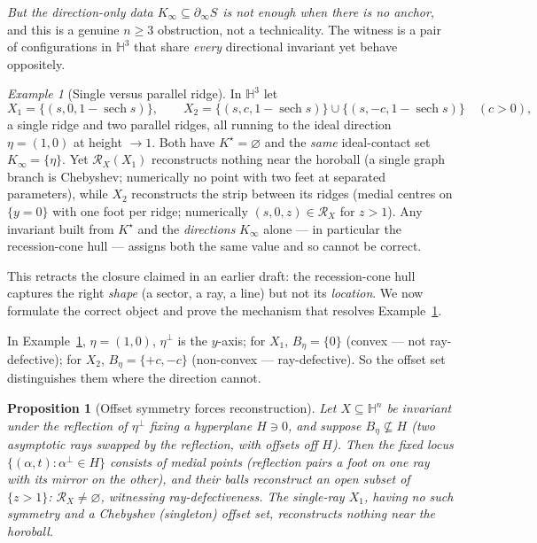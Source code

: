 \documentclass[11pt]{article}
\newtheorem{proposition}[theorem]{Proposition}
\theoremstyle{remark}
\newtheorem{example}[theorem]{Example}
\newcommand{\X}{X}
\newcommand{\Rx}{\mathcal{R}_{\X}}
\newcommand{\Sb}[1]{S_{#1}}
\begin{document}
\emph{But the direction-only data $K_{\infty}\subseteq\partial_{\infty}
\Sb{}$ is not enough when there is no anchor}, and this is a genuine
$n\ge3$ obstruction, not a technicality. The witness is a pair of
configurations in $\mathbb{H}^{3}$ that share \emph{every} directional
invariant yet behave oppositely.

\begin{example}[Single versus parallel ridge]\label{ex:parallel}
In $\mathbb{H}^{3}$ let
\[
\X_{1}=\{(s,0,1-\operatorname{sech}s)\},\qquad
\X_{2}=\{(s,c,1-\operatorname{sech}s)\}\cup\{(s,-c,1-\operatorname{sech}
s)\}\quad(c>0),
\]
a single ridge and two parallel ridges, all running to the ideal
direction $\eta=(1,0)$ at height $\to1$. Both have $K^{\star}=
\varnothing$ and the \emph{same} ideal-contact set $K_{\infty}=
\{\eta\}$. Yet $\Rx(\X_{1})$ reconstructs nothing near the horoball
(a single graph branch is Chebyshev; numerically no point with two feet
at separated parameters), while $\X_{2}$ reconstructs the strip between
its ridges (medial centres on $\{y=0\}$ with one foot per ridge;
numerically $(s,0,z)\in\Rx$ for $z>1$). Any invariant built from
$K^{\star}$ and the \emph{directions} $K_{\infty}$ alone --- in
particular the recession-cone hull --- assigns both the same value and
so cannot be correct.
\end{example}

This retracts the closure claimed in an earlier draft: the
recession-cone hull captures the right \emph{shape} (a sector, a ray, a
line) but not its \emph{location}. We now formulate the correct object
and prove the mechanism that resolves Example~\ref{ex:parallel}.

In Example~\ref{ex:parallel}, $\eta=(1,0)$, $\eta^{\perp}$ is the
$y$-axis; for $\X_{1}$, $B_{\eta}=\{0\}$ (convex --- not ray-defective);
for $\X_{2}$, $B_{\eta}=\{+c,-c\}$ (non-convex --- ray-defective). So
the offset set distinguishes them where the direction cannot.

\begin{proposition}[Offset symmetry forces reconstruction]
\label{prop:offsetsym}
Let $\X\subseteq\mathbb{H}^{n}$ be invariant under the reflection of
$\eta^{\perp}$ fixing a hyperplane $H\ni0$, and suppose
$B_{\eta}\not\subseteq H$ (two asymptotic rays swapped by the
reflection, with offsets off $H$). Then the fixed locus
$\{(\alpha,t):\alpha^{\perp}\in H\}$ consists of medial points
(reflection pairs a foot on one ray with its mirror on the other), and
their balls reconstruct an open subset of $\{z>1\}$: $\Rx\neq
\varnothing$, witnessing ray-defectiveness. The single-ray $\X_{1}$,
having no such symmetry and a Chebyshev (singleton) offset set,
reconstructs nothing near the horoball.
\end{proposition}
\end{document}
